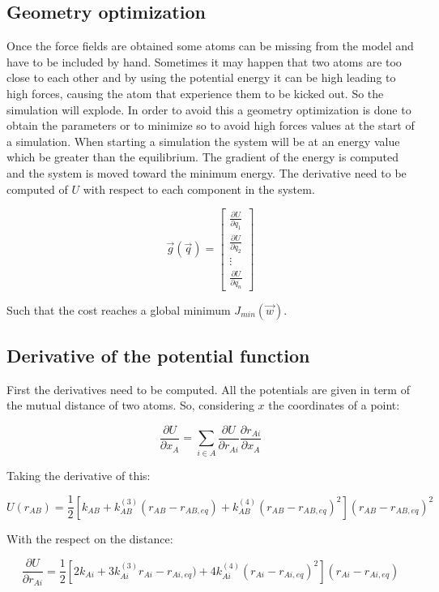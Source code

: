 	\subsection{Geometry optimization}
	Once the force fields are obtained some atoms can be missing from the model and have to be included by hand.
	Sometimes it may happen that two atoms are too close to each other and by using the potential energy it can be high leading to high forces, causing the atom that experience them to be kicked out.
	So the simulation will explode.
	In order to avoid this a geometry optimization is done to obtain the parameters or to minimize so to avoid high forces values at the start of a simulation.
	When starting a simulation the system will be at an energy value which be greater than the equilibrium.
	The gradient of the energy is computed and the system is moved toward the minimum energy.
	The derivative need to be computed of $U$ with respect to each component in the system.

	$$\vec{g}(\vec{q}) = \begin{bmatrix} \frac{\partial U}{\partial q_1} \\ \frac{\partial U}{\partial q_2} \\ \vdots \\ \frac{\partial U}{\partial q_n}\end{bmatrix}$$

	Such that the cost reaches a global minimum $J_{min}(\vec{w})$.

	\subsection{Derivative of the potential function}
	First the derivatives need to be computed.
	All the potentials are given in term of the mutual distance of two atoms.
	So, considering $x$ the coordinates of a point:

	$$\frac{\partial U}{\partial x_A} = \sum\limits_{i\in A}\frac{\partial U}{\partial r_{Ai}}\frac{\partial r_{Ai}}{\partial x_A}$$

	Taking the derivative of this:

	$$U(r_{AB}) = \frac{1}{2}[k_{AB}+k_{AB}^{(3)}(r_{AB}-r_{AB, eq}) + k_{AB}^{(4)}(r_{AB}-r_{AB, eq})^2](r_{AB}-r_{AB,eq})^2$$

	With the respect on the distance:

	$$\frac{\partial U}{\partial r_{Ai}} = \frac{1}{2}[2k_{Ai}+3k_{Ai}^{(3)}r_{Ai}-r_{Ai, eq}) + 4k^{(4)}_{Ai}(r_{Ai}-r_{Ai, eq})^2](r_{Ai}-r_{Ai, eq})$$

